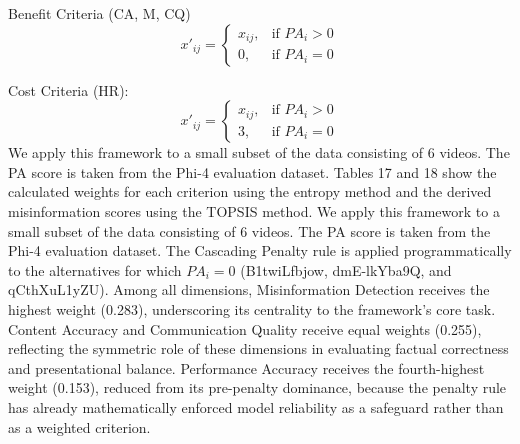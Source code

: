 \documentclass[]{article}
\begin{document}
Benefit Criteria (CA, M, CQ)
\begin{equation}
x'_{ij} =
\begin{cases}
x_{ij}, & \text{if } PA_i > 0 \\
0, & \text{if } PA_i = 0
\end{cases}
\end{equation}

Cost Criteria (HR):
\begin{equation}
x'_{ij} =
\begin{cases}
x_{ij}, & \text{if } PA_i > 0 \\
3, & \text{if } PA_i = 0
\end{cases}
\end{equation}
We apply this framework to a small subset of the data consisting of 6 videos. The PA score is taken from the Phi-4 evaluation dataset. Tables 17 and 18 show the calculated weights for each criterion using the entropy method and the derived misinformation scores using the TOPSIS method. We apply this framework to a small subset of the data consisting of 6 videos. The PA score is taken from the Phi-4 evaluation dataset.  The Cascading Penalty rule is applied programmatically to the alternatives for which $PA_i = 0$ (B1twiLfbjow, dmE-lkYba9Q, and qCthXuL1yZU). Among all dimensions, Misinformation Detection receives the highest weight (0.283), underscoring its centrality to the framework's core task. Content Accuracy and Communication Quality receive equal weights (0.255), reflecting the symmetric role of these dimensions in evaluating factual correctness and presentational balance. Performance Accuracy receives the fourth-highest weight (0.153), reduced from its pre-penalty dominance, because the penalty rule has already mathematically enforced model reliability as a safeguard rather than as a weighted criterion.
\end{document}
